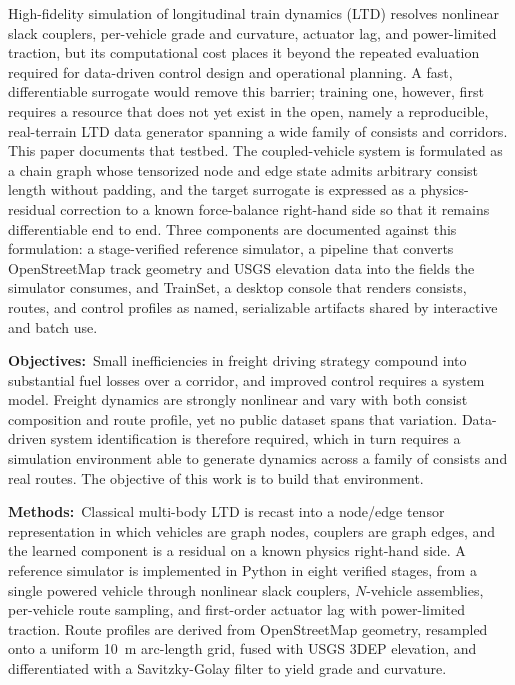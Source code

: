 \documentclass[numbered]{trbunofficial}
\begin{document}
High-fidelity simulation of longitudinal train dynamics (LTD) resolves nonlinear slack couplers, per-vehicle grade and curvature, actuator lag, and power-limited traction, but its computational cost places it beyond the repeated evaluation required for data-driven control design and operational planning. A fast, differentiable surrogate would remove this barrier; training one, however, first requires a resource that does not yet exist in the open, namely a reproducible, real-terrain LTD data generator spanning a wide family of consists and corridors. This paper documents that testbed. The coupled-vehicle system is formulated as a chain graph whose tensorized node and edge state admits arbitrary consist length without padding, and the target surrogate is expressed as a physics-residual correction to a known force-balance right-hand side so that it remains differentiable end to end. Three components are documented against this formulation: a stage-verified reference simulator, a pipeline that converts OpenStreetMap track geometry and USGS elevation data into the fields the simulator consumes, and TrainSet, a desktop console that renders consists, routes, and control profiles as named, serializable artifacts shared by interactive and batch use.

\vspace{0.25\baselineskip}
\noindent\textbf{Objectives:}~Small inefficiencies in freight driving strategy compound into substantial fuel losses over a corridor, and improved control requires a system model. Freight dynamics are strongly nonlinear and vary with both consist composition and route profile, yet no public dataset spans that variation. Data-driven system identification is therefore required, which in turn requires a simulation environment able to generate dynamics across a family of consists and real routes. The objective of this work is to build that environment.

\vspace{0.25\baselineskip}
\noindent\textbf{Methods:}~Classical multi-body LTD is recast into a node/edge tensor representation in which vehicles are graph nodes, couplers are graph edges, and the learned component is a residual on a known physics right-hand side. A reference simulator is implemented in Python in eight verified stages, from a single powered vehicle through nonlinear slack couplers, $N$-vehicle assemblies, per-vehicle route sampling, and first-order actuator lag with power-limited traction. Route profiles are derived from OpenStreetMap geometry, resampled onto a uniform 10~m arc-length grid, fused with USGS 3DEP elevation, and differentiated with a Savitzky-Golay filter to yield grade and curvature.
\end{document}
